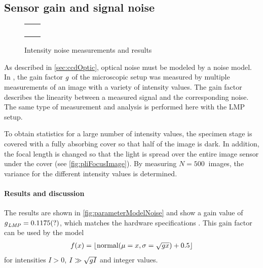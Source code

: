 \subsection{Sensor gain and signal noise}\label{sec:sensorGain}
%
\begin{figure}[!t]
\centering
%
\setlength{\tikzwidth}{0.3\textwidth}
\setlength{\tikzheight}{0.3\textwidth}
%
\setlength{\tabcolsep}{0em}
\begin{tabular}{C{0.5\textwidth}C{0.5\textwidth}}
&
\\[-1em]
%
 &
 \\[2em]
%
&
\\[-1em]
%
 &
\end{tabular}
%
\caption{Intensity noise measurements and results}
\label{fig:parameterModelGain}
\end{figure}
%
As described in \cref{sec:ccdOptic}, optical noise must be modeled by a noise model.
In \cite{Wiese:887678}, the gain factor $\textnormal{$g$}$ of the microscopic setup was measured by multiple measurements of an image with a variety of intensity values.
The gain factor describes the linearity between a measured signal and the corresponding noise.
The same type of measurement and analysis is performed here with the \ac{LMP} setup.
\par
To obtain statistics for a large number of intensity values, the specimen stage is covered with a fully absorbing cover so that half of the image is dark.
In addition, the focal length is changed so that the light is spread over the entire image sensor under the cover (see \cref{fig:pliFocusImage}).
By measuring $N=\SI{500}{}$ images, the variance for the different intensity values is determined.
%
\paragraph{Results and discussion}
The results are shown in \cref{fig:parameterModelNoise} and show a gain value of $\textnormal{$g$}_{\mathit{LMP}} = \SI{0.1175}{}(?)$, which matches the hardware specifications .
This gain factor can be used by the model
\begin{align}
f(x) = \lfloor\mathrm{normal}(\mu = x, \sigma=\sqrt{\textnormal{$g$} x})+0.5\rfloor
\end{align}
for intensities $I > 0$, $I \gg \sqrt{\textnormal{$g$} I}$ and integer values.
%
%
%

